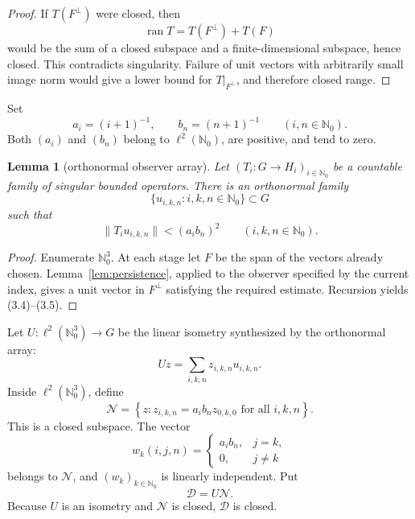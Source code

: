 \documentclass[11pt]{article}
\newtheorem{lemma}[theorem]{Lemma}
\newcommand{\N}{\mathbb N_0}
\newcommand{\ran}{\operatorname{ran}}
\newcommand{\cD}{\mathcal D}
\newcommand{\cN}{\mathcal N}
\begin{document}
\begin{proof}
If \(T(F^\perp)\) were closed, then
\[
  \ran T=T(F^\perp)+T(F)
\]
would be the sum of a closed subspace and a finite-dimensional subspace,
hence closed.  This contradicts singularity.  Failure of unit vectors with
arbitrarily small image norm would give a lower bound for
\(T|_{F^\perp}\), and therefore closed range.
\end{proof}

Set
\[
  a_i=(i+1)^{-1},\qquad b_n=(n+1)^{-1}
  \qquad(i,n\in\N).
  \tag{3.3}
\]
Both \((a_i)\) and \((b_n)\) belong to \(\ell^2(\N)\), are positive, and
tend to zero.

\begin{lemma}[orthonormal observer array]\label{lem:array}
Let \((T_i:G\to H_i)_{i\in\N}\) be a countable family of singular bounded
operators.  There is an orthonormal family
\[
  \{u_{i,k,n}:i,k,n\in\N\}\subset G
  \tag{3.4}
\]
such that
\[
  \|T_i u_{i,k,n}\|<(a_i b_n)^2
  \qquad(i,k,n\in\N).
  \tag{3.5}
\]
\end{lemma}

\begin{proof}
Enumerate \(\N^3\).  At each stage let \(F\) be the span of the vectors
already chosen.  Lemma~\ref{lem:persistence}, applied to the observer
specified by the current index, gives a unit vector in \(F^\perp\) satisfying
the required estimate.  Recursion yields (3.4)--(3.5).
\end{proof}

Let \(U:\ell^2(\N^3)\to G\) be the linear isometry synthesized by the
orthonormal array:
\[
  Uz=\sum_{i,k,n}z_{i,k,n}u_{i,k,n}.
  \tag{3.6}
\]
Inside \(\ell^2(\N^3)\), define
\[
  \cN=\left\{z:
    z_{i,k,n}=a_i b_n z_{0,k,0}
    \text{ for all }i,k,n\right\}.
  \tag{3.7}
\]
This is a closed subspace.  The vector
\[
  w_k(i,j,n)=
  \begin{cases}
    a_i b_n,&j=k,\\
    0,&j\ne k
  \end{cases}
  \tag{3.8}
\]
belongs to \(\cN\), and \((w_k)_{k\in\N}\) is linearly independent.
Put
\[
  \cD=U\cN.
  \tag{3.9}
\]
Because \(U\) is an isometry and \(\cN\) is closed, \(\cD\) is closed.
\end{document}
